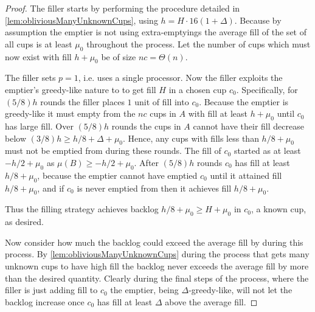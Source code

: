 \begin{proof}
  The filler starts by performing the procedure detailed in
  \cref{lem:obliviousManyUnknownCups}, using $h = H\cdot
  16(1+\Delta)$. Because by assumption the emptier is not using
  extra-emptyings the average fill of the set of all cups is at
  least $\mu_0$ throughout the process.
  Let the number of cups which must now exist with
  fill $h+\mu_0$ be of size $nc = \Theta(n)$.

  The filler sets $p=1$, i.e. uses a single processor. Now the
  filler exploits the emptier's greedy-like nature to to get fill
  $H$ in a chosen cup $c_0$. Specifically, for $(5/8)h$ rounds
  the filler places $1$ unit of fill into $c_0$. Because the
  emptier is greedy-like it must empty from the $nc$ cups in $A$
  with fill at least $h+\mu_0$ until $c_0$ has large fill. Over
  $(5/8)h$ rounds the cups in $A$ cannot have their fill decrease
  below $(3/8)h \ge h/8 + \Delta + \mu_0$. Hence, any cups with fills
  less than $h/8+\mu_0$ must not be emptied from during these rounds.
  The fill of $c_0$ started as at least $-h/2+\mu_0$ as $\mu(B) \ge
  -h/2+\mu_0$. After $(5/8)h$ rounds $c_0$ has fill at least
  $h/8+\mu_0$,
  because the emptier cannot have emptied $c_0$ until it attained
  fill $h/8+\mu_0$, and if $c_0$ is never emptied from then it achieves
  fill $h/8+\mu_0$.

  Thus the filling strategy achieves backlog $h/8 +\mu_0 \ge H +
  \mu_0$ in $c_0$, a known cup, as desired.

  Now consider how much the backlog could exceed the average fill
  by during this process. By \cref{lem:obliviousManyUnknownCups}
  during the process that gets many unknown cups to have high
  fill the backlog never exceeds the average fill by more than
  the desired quantity. Clearly during the final steps of the
  process, where the filler is just adding fill to $c_0$ the
  emptier, being $\Delta$-greedy-like, will not let the backlog
  increase once $c_0$ has fill at least $\Delta$ above the
  average fill.

\end{proof}






















